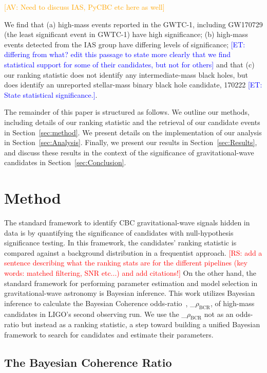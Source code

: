 \documentclass[%
 nofootinbib,
 amsmath,amssymb,
 aps,
 twocolumn
]{revtex4-2}
\newcommand{\mathcmd}[1]{{\sc \relax\ifmmode#1\else $#1$\fi}\xspace}
\newcommand{\bcr}{\mathcmd{\rho_\text{BCR}}}
\newcommand{\avi}[1]{\textcolor{orange}{[AV: #1]}}
\newcommand{\rs}[1]{\textcolor{red}{[RS: #1]}}
\newcommand{\et}[1]{\textcolor{blue}{[ET: #1]}}
\begin{document}
\avi{Need to discuss IAS, PyCBC etc here as well}

We find that (a) high-mass events reported in the GWTC-1, including GW170729 (the least significant event in GWTC-1) have high significance; (b) high-mass events detected from the IAS group have differing levels of significance; \et{differing from what? edit this passage to state more clearly that we find statistical support for some of their candidates, but not for others} and that (c) our ranking statistic does not identify any intermediate-mass black holes, but does identify an unreported stellar-mass binary black hole candidate, 170222 \et{State statistical significance.}.

The remainder of this paper is structured as follows. We outline our methods, including details of our ranking statistic and the retrieval of our candidate events in Section~\ref{sec:method}. We present details on the implementation of our analysis in Section~\ref{sec:Analysis}. Finally, we present our results in Section~\ref{sec:Results}, and discuss these results in the context of the significance of gravitational-wave candidates in Section~\ref{sec:Conclusion}.



\section{Method\label{sec:method}}

The standard framework to identify CBC gravitational-wave signals hidden in data is by quantifying the significance of candidates with null-hypothesis significance testing. In this framework, the candidates' ranking statistic is compared against a background distribution in a frequentist approach. \rs{add a sentence describing what the ranking stats are for the different pipelines (key words: matched filtering, SNR etc...) and add citations!} On the other hand, the standard framework for performing parameter estimation and model selection in gravitational-wave astronomy is Bayesian inference. This work utilizes Bayesian inference to calculate the Bayesian Coherence odds-ratio~\cite{BCR1}, \bcr, of high-mass candidates in LIGO's second observing run. We use the \bcr not as an odds-ratio but instead as a ranking statistic, a step toward building a unified Bayesian framework to search for candidates and estimate their parameters.

\subsection{The Bayesian Coherence Ratio}
\end{document}
